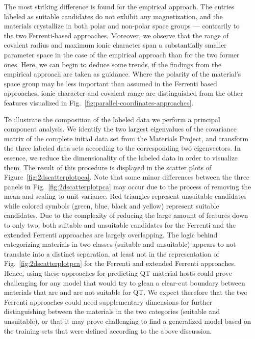 \documentclass[superscriptaddress,unsortedaddress,
 amsmath,amssymb,
 aps,
]{revtex4-2}
\begin{document}
The most striking difference is found for the empirical approach. The entries labeled as suitable candidates do not exhibit any magnetization, and the materials crystallize in both polar and non-polar space groups --- contrarily to the two Ferrenti-based approaches. Moreover, we observe that the range of covalent radius and maximum ionic character span a substantially smaller parameter space in the case of the empirical approach than for the two former ones.  
Here, we can begin to deduce some trends, if the findings from the empirical approach are taken as guidance. Where the polarity of the material's space group may be less important than assumed in the Ferrenti based approaches, ionic character and covalent range are distinguished from the other features visualized in Fig.~\ref{fig:parallel-coordinates-approaches}. 


To illustrate the composition of the labeled data we perform a principal component analysis. We identify the two largest eigenvalues of the covariance matrix \cite{Hastie2009} of the complete initial data set from the Materials Project, and transform the three labeled data sets according to the corresponding two eigenvectors. In essence, we reduce the dimensionality of the labeled data in order to visualize them.
The result of this procedure is displayed in the scatter plots of Figure~\ref{fig:2dscatterplotpca}. Note that some minor differences between the three panels in Fig.~\ref{fig:2dscatterplotpca} may occur due to the process of 
removing the mean and scaling to unit variance.
Red triangles represent unsuitable candidates while colored symbols (green, blue, black and yellow) represent suitable candidates. 
Due to the complexity of reducing the large amount of features down to only two, both suitable and unsuitable candidates for the Ferrenti and the extended Ferrenti approaches are largely overlapping. 
The logic behind categorizing materials in two classes (suitable and unsuitable) appears to not translate into a distinct separation, at least not in the representation of  Fig.~\ref{fig:2dscatterplotpca} for the Ferrenti and extended Ferrenti approaches.  
Hence, using these approaches for predicting QT material hosts could prove challenging for any model that would try to glean a clear-cut boundary between materials that are and are not suitable for QT. 
We expect therefore that the two Ferrenti approaches could need supplementary dimensions for further distinguishing between the materials in the two categories (suitable and unsuitable), or that it may prove challenging to find a generalized model based on the training sets that were defined according to the above discussion. 
\end{document}
